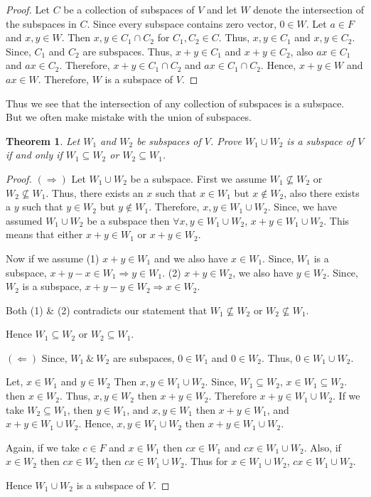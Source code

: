 \documentclass[12pt, a4paper]{article}
\newtheorem{theorem}{Theorem}[section]
\theoremstyle{definition}
\theoremstyle{remark}
\theoremstyle{solution}
\begin{document}
\begin{proof}
    Let $C$ be a collection of subspaces of $V$ and let $W$ denote the intersection of the subspaces in $C$. Since every subspace contains zero vector, $0 \in W$. Let $a \in F$ and $x, y \in W$. Then $x, y \in C_1 \cap C_2$ for $C_1, C_2 \in C$. Thus, $x, y \in C_1$ and $x, y \in C_2$. Since, $C_1$ and $C_2$ are subspaces. Thus, $x+y \in C_1$ and $x+y \in C_2$, also $ax \in C_1$ and $ax \in C_2$. Therefore, $x+y \in C_1 \cap C_2$ and $ax \in C_1 \cap C_2$. Hence, $x+y \in W$ and $ax \in W$. Therefore, $W$ is a subspace of $V$.
\end{proof}

Thus we see that the intersection of any collection of subspaces is a subspace. But we often make mistake with the union of subspaces.

\begin{theorem}
    Let $W_1$ and $W_2$ be subspaces of $V$. Prove $W_1 \cup W_2$ is a subspace of $V$ if and only if $W_1 \subseteq W_2$ or $W_2 \subseteq W_1$.    
\end{theorem}

\begin{proof}
    $(\Rightarrow)$ Let $W_1 \cup W_2$ be a subspace. First we assume $W_1 \not\subseteq W_2$ or $W_2 \not\subseteq W_1$. Thus, there exists an $x$ such that $x \in W_1$ but $x \not\in W_2$, also there exists a $y$ such that $y \in W_2$ but $y \not\in W_1$. Therefore, $x, y \in W_1 \cup W_2$. Since, we have assumed $W_1 \cup W_2$ be a subspace then $\forall x, y \in W_1 \cup W_2$, $x+y \in W_1 \cup W_2$. This means that either $x+y \in W_1$ or $x+y \in W_2$.

Now if we assume (1) $x+y \in W_1$ and we also have $x \in W_1$. Since, $W_1$ is a subspace, $x+y - x \in W_1 \Rightarrow y \in W_1$. (2) $x+y \in W_2$, we also have $y \in W_2$. Since, $W_2$ is a subspace, $x+y - y \in W_2 \Rightarrow x \in W_2$.

Both (1) \& (2) contradicts our statement that $W_1 \not\subseteq W_2$ or $W_2 \not\subseteq W_1$.

Hence $W_1 \subseteq W_2$ or $W_2 \subseteq W_1$.

$(\Leftarrow)$ Since, $W_1 \ \& \ W_2$ are subspaces, $0 \in W_1$ and $0 \in W_2$. Thus, $0 \in W_1 \cup W_2$.

Let, $x \in W_1$ and $y \in W_2$ Then $x, y \in W_1 \cup W_2$. Since, $W_1 \subseteq W_2$, $x \in W_1 \subseteq W_2$. then $x \in W_2$. Thus, $x, y \in W_2$ then $x+y \in W_2$. Therefore $x+y \in W_1 \cup W_2$. If we take $W_2 \subseteq W_1$, then $y \in W_1$, and $x, y \in W_1$ then $x+y \in W_1$, and $x+y \in W_1 \cup W_2$. Hence, $x, y \in W_1 \cup W_2$ then $x+y \in W_1 \cup W_2$.

Again, if we take $c \in F$ and $x \in W_1$ then $cx \in W_1$ and $cx \in W_1 \cup W_2$. Also, if $x \in W_2$ then $cx \in W_2$ then $cx \in W_1 \cup W_2$. Thus for $x \in W_1 \cup W_2$, $cx \in W_1 \cup W_2$.

Hence $W_1 \cup W_2$ is a subspace of $V$.
\end{proof}
\end{document}
